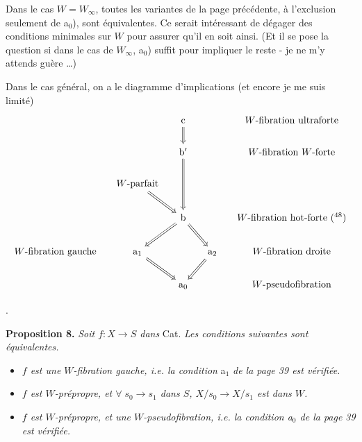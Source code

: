 \documentclass[11pt]{article}
\newcommand{\msp}[1]{\marginpar{\footnotesize [#1]}}
\newcommand{\fl}{\longrightarrow}
\begin{document}
Dans le cas $W=W_\infty$, toutes les variantes de la page précédente, à l'exclusion seulement de a$_0$), sont équivalentes. Ce serait intéressant de dégager des conditions minimales sur $W$ pour assurer qu'il en soit ainsi. (Et il se pose la question si dans le cas de $W_\infty$, a$_0$) suffit pour impliquer le reste - je ne m'y attends guère \dots)

Dans le cas général, on a le diagramme d'implications (et encore je me suis limité)
\[
\begin{tikzcd}[column sep=small]
 & & \mathrm{c} \arrow[d, Rightarrow] & & \text{$W$-fibration ultraforte} \\
 & & \mathrm{b}' \arrow[dd, Rightarrow] & & \text{$W$-fibration $W$-forte} \\
 & \text{$W$-parfait} \arrow[dr, Rightarrow] & & & \\
 & & \mathrm{b} \arrow[dl, Rightarrow] \arrow[dr, Rightarrow] & & \text{$W$-fibration hot-forte (\footnotemark[48])} \\
\text{$W$-fibration gauche} & \mathrm{a}_1 \arrow[dr, Rightarrow] & & \mathrm{a}_2 \arrow[dl, Rightarrow] & \text{$W$-fibration droite} \\
 & & \mathrm{a}_0 & & \text{$W$-pseudofibration}
\end{tikzcd}
\]

.

\msp{page 41}\textbf{Proposition 8.} \textit{Soit $f : X\fl S$ dans} Cat. \textit{Les conditions suivantes sont équivalentes.}

\begin{itemize}
\item[\textit{a)}] \textit{$f$ est une $W$-fibration gauche, i.e. la condition} a$_1$ \textit{de la page 39 est vérifiée.}

\item[\textit{b)}] \textit{$f$ est $W$-prépropre, et $\forall\; s_0\fl s_1$ dans $S$, $X/s_0\fl X/s_1$ est dans $W$.}

\item[\textit{c)}] \textit{$f$ est $W$-prépropre, et une $W$-pseudofibration, i.e. la condition a$_0$ de la page 39 est vérifiée.} %
\end{itemize}
\end{document}
